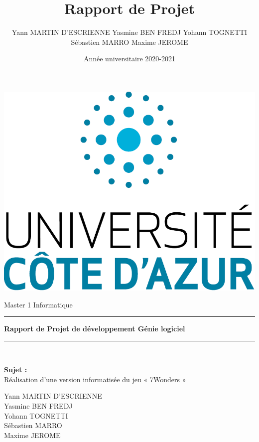 \documentclass[13pt ,a4paper ]{report}
\title{{\Huge Rapport de Projet}}
\author{
Yann MARTIN D'ESCRIENNE 
Yasmine BEN FREDJ 
Yohann TOGNETTI 
Sébastien MARRO
Maxime JEROME
}
\date{Année universitaire 2020-2021}
\begin{document}
	\begin{titlepage}
	
		\begin{center}
			\includegraphics[scale=0.3]{logo.png}
		\end{center}
		
		\vspace{0.5cm}
		\begin{center}		
			{\Large  Master 1 Informatique}
		\end{center}
		\vspace{1cm}
		
		\rule{1\linewidth}{1.1pt}\newline   %
		\begin{center}
			 {\Huge \textbf{Rapport de Projet de développement Génie logiciel}}
		\end{center}
		\rule{1\linewidth}{1.1pt} \\
		
		\begin{center}
		\begin{LARGE}
		\textbf{Sujet :} \\\vspace{0.6cm} Réalisation d'une version informatisée du jeu « 7Wonders »
		\end{LARGE}
		\end{center}
		
		\vspace{0.5cm}
		\begin{center}	
				\begin{Large}
				Yann MARTIN D'ESCRIENNE \\ 
				Yasmine BEN FREDJ  \\
				Yohann TOGNETTI \\ 
				Sébastien MARRO \\
				Maxime JEROME\\
				\end{Large}
		\end{center}
		\vspace{6cm}
		

\end{titlepage}
\end{document}
